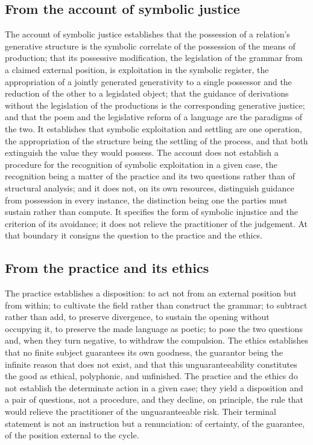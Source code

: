 \subsection{From the account of symbolic justice}
\label{p10:sec:concl-exploitation}

The account of symbolic justice establishes that the possession of a relation's generative structure is the symbolic correlate of the possession of the means of production; that its possessive modification, the legislation of the grammar from a claimed external position, is exploitation in the symbolic register, the appropriation of a jointly generated generativity to a single possessor and the reduction of the other to a legislated object; that the guidance of derivations without the legislation of the productions is the corresponding generative justice; and that the poem and the legislative reform of a language are the paradigms of the two. It establishes that symbolic exploitation and settling are one operation, the appropriation of the structure being the settling of the process, and that both extinguish the value they would possess. The account does not establish a procedure for the recognition of symbolic exploitation in a given case, the recognition being a matter of the practice and its two questions rather than of structural analysis; and it does not, on its own resources, distinguish guidance from possession in every instance, the distinction being one the parties must sustain rather than compute. It specifies the form of symbolic injustice and the criterion of its avoidance; it does not relieve the practitioner of the judgement. At that boundary it consigns the question to the practice and the ethics.

\subsection{From the practice and its ethics}
\label{p10:sec:concl-praxis}

The practice establishes a disposition: to act not from an external position but from within; to cultivate the field rather than construct the grammar; to subtract rather than add, to preserve divergence, to sustain the opening without occupying it, to preserve the made language as poetic; to pose the two questions and, when they turn negative, to withdraw the compulsion. The ethics establishes that no finite subject guarantees its own goodness, the guarantor being the infinite reason that does not exist, and that this unguaranteeability constitutes the good as ethical, polyphonic, and unfinished. The practice and the ethics do not establish the determinate action in a given case; they yield a disposition and a pair of questions, not a procedure, and they decline, on principle, the rule that would relieve the practitioner of the unguaranteeable risk. Their terminal statement is not an instruction but a renunciation: of certainty, of the guarantee, of the position external to the cycle.

